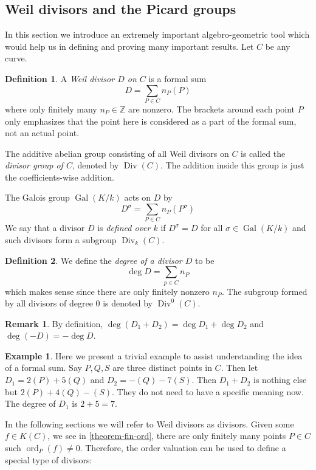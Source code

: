 \documentclass[12pt]{article}
\theoremstyle{remark}
\theoremstyle{definition}
\newtheorem{remark}{Remark}[subsection]
\newtheorem{example}{Example}[subsection]
\newtheorem{definition}{Definition}[subsection]
\newcommand{\ord}[0]{\operatorname{ord}}
\newcommand{\s}[0]{\sigma}
\newcommand{\Z}[0]{\mathbb{Z}}
\newcommand{\Gal}[0]{\operatorname{Gal}}
\newcommand{\Div}[0]{\operatorname{Div}}
\begin{document}
    \subsection{Weil divisors and the Picard groups}\label{ssec-divisor}
        In this section we introduce an extremely important algebro-geometric tool which would help us in defining and proving many important results. Let $C$ be any curve.
        \begin{definition}
            A \textit{Weil divisor $D$ on $C$} is a formal sum
            \[D=\sum_{P\in C}n_P(P)\]
            where only finitely many $n_P\in\Z$ are nonzero. The brackets around each point $P$ only emphasizes that the point here is considered as a part of the formal sum, not an actual point.
        
            The additive abelian group consisting of all Weil divisors on $C$ is called the \textit{divisor group of $C$}, denoted by $\Div(C)$. The addition inside this group is just the coefficients-wise addition.
        \end{definition}
        \noindent The Galois group $\Gal(K/k)$ acts on $D$ by 
        \[D^\s=\sum_{P\in C}n_P(P^\s)\]
        We say that a divisor $D$ is \textit{defined over $k$} if $D^\s=D$ for all $\s\in\Gal(K/k)$ and such divisors form a subgroup $\Div_k(C)$.
        \begin{definition}
            We define the \textit{degree of a divisor $D$} to be
            \[\deg D=\sum_{p\in C}n_P\]
            which makes sense since there are only finitely nonzero $n_P$. The subgroup formed by all divisors of degree $0$ is denoted by $\Div^0(C)$.
        \end{definition}
        \begin{remark}
            By definition, $\deg (D_1+D_2)=\deg D_1+\deg D_2$ and $\deg (-D)=-\deg D$.
        \end{remark}
        \begin{example}
            Here we present a trivial example to assist understanding the idea of a formal sum. Say $P, Q, S$ are three distinct points in $C$. Then let $D_1=2(P)+5(Q)$ and $D_2=-(Q)-7(S)$. Then $D_1+D_2$ is nothing else but $2(P)+4(Q)-(S)$. They do not need to have a specific meaning now. The degree of $D_1$ is $2+5=7$.
        \end{example}
        \noindent In the following sections we will refer to Weil divisors as divisors. Given some $f\in K(C)$, we see in \autoref{theorem-fin-ord}, there are only finitely many points $P\in C$ such $\ord_P(f)\neq 0$. Therefore, the order valuation can be used to define a special type of divisors:
\end{document}
